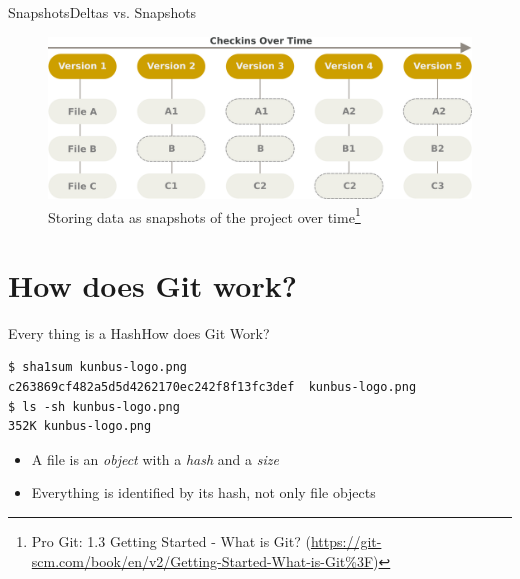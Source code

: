 \documentclass[aspectratio=169]{beamer}
\begin{document}
\begin{frame}{Snapshots}{Deltas vs. Snapshots}
\begin{figure}
    \centering
    \includegraphics[width=\textwidth,height=0.6\textheight,keepaspectratio]{snapshots}
    \caption {
        Storing data as snapshots of the project over time\footnote{
            Pro Git: 1.3 Getting Started - What is Git?
            (\url{https://git-scm.com/book/en/v2/Getting-Started-What-is-Git\%3F})
        }
    }
\end{figure}
\end{frame}

\section{How does Git work?}
\begin{frame}[fragile]{Every thing is a Hash}{How does Git Work?}
\begin{verbatim}
$ sha1sum kunbus-logo.png 
c263869cf482a5d5d4262170ec242f8f13fc3def  kunbus-logo.png
$ ls -sh kunbus-logo.png 
352K kunbus-logo.png
\end{verbatim}
\begin{itemize}
    \item A file is an \emph{object} with a \emph{hash} and a \emph{size}
    \item Everything is identified by its hash, not only file objects
\end{itemize}
\end{frame}
\end{document}
